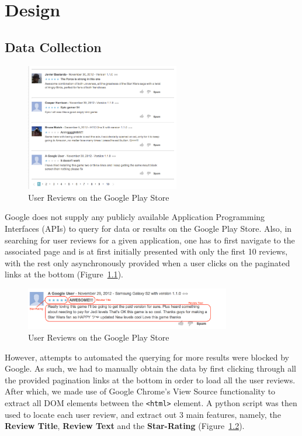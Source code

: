 \documentclass[11pt]{report} %
\begin{document}
\chapter{Design}
\section{Data Collection}

\begin{figure}[h!]
  \centering
    \includegraphics[width=0.6\textwidth]{figures/playstore.png}
 \caption{User Reviews on the Google Play Store}
\label{fig:playstore}
\end{figure}

Google does not supply any publicly available Application Programming Interfaces (APIs) to query for data or results on the Google Play Store. Also, in searching for user reviews for a given application, one has to first navigate to the associated page and is at first initially presented with only the first 10 reviews, with the rest only asynchronously provided when a user clicks on the paginated links at the bottom (Figure~\ref{fig:playstore}). 

\begin{figure}[h!]
  \centering
    \includegraphics[width=0.8\textwidth]{figures/user_review.png}
 \caption{User Reviews on the Google Play Store}
\label{fig:user_review}
\end{figure}

However, attempts to automated the querying for more results were blocked by Google. As such, we had to manually obtain the data by first clicking through all the provided pagination links at the bottom in order to load all the user reviews. After which, we made use of Google Chrome's View Source functionality to extract all DOM elements between the \verb|<html>| element. A python script was then used to locate each user review, and extract out 3 main features, namely, the \textbf{Review Title}, \textbf{Review Text} and the \textbf{Star-Rating} (Figure~\ref{fig:user_review}).
\end{document}
